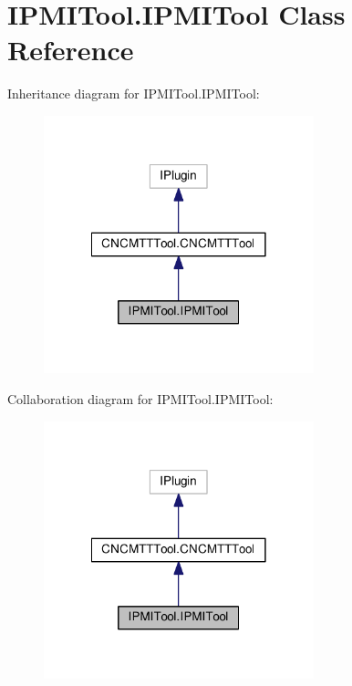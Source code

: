 \hypertarget{class_i_p_m_i_tool_1_1_i_p_m_i_tool}{\section{I\-P\-M\-I\-Tool.\-I\-P\-M\-I\-Tool Class Reference}
\label{class_i_p_m_i_tool_1_1_i_p_m_i_tool}
}


Inheritance diagram for I\-P\-M\-I\-Tool.\-I\-P\-M\-I\-Tool\-:
\nopagebreak
\begin{figure}[H]
\begin{center}
\leavevmode
\includegraphics[width=222pt]{class_i_p_m_i_tool_1_1_i_p_m_i_tool__inherit__graph}
\end{center}
\end{figure}


Collaboration diagram for I\-P\-M\-I\-Tool.\-I\-P\-M\-I\-Tool\-:
\nopagebreak
\begin{figure}[H]
\begin{center}
\leavevmode
\includegraphics[width=222pt]{class_i_p_m_i_tool_1_1_i_p_m_i_tool__coll__graph}
\end{center}
\end{figure}
